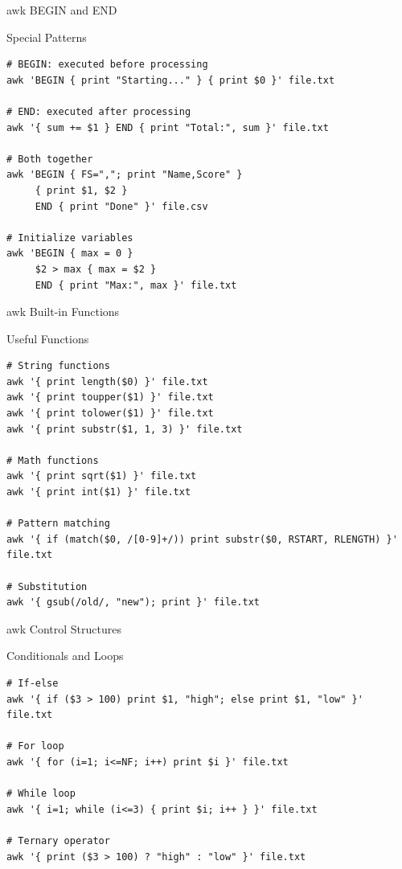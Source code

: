 \documentclass[presentation,aspectratio=1610]{beamer}
\begin{document}
\begin{frame}[label={sec:org9f205de},fragile]{awk BEGIN and END}
 \begin{block}{Special Patterns}
\begin{verbatim}
# BEGIN: executed before processing
awk 'BEGIN { print "Starting..." } { print $0 }' file.txt

# END: executed after processing
awk '{ sum += $1 } END { print "Total:", sum }' file.txt

# Both together
awk 'BEGIN { FS=","; print "Name,Score" } 
     { print $1, $2 } 
     END { print "Done" }' file.csv

# Initialize variables
awk 'BEGIN { max = 0 } 
     $2 > max { max = $2 } 
     END { print "Max:", max }' file.txt
\end{verbatim}
\end{block}
\end{frame}
\begin{frame}[label={sec:orga9a0d52},fragile]{awk Built-in Functions}
 \begin{block}{Useful Functions}
\begin{verbatim}
# String functions
awk '{ print length($0) }' file.txt
awk '{ print toupper($1) }' file.txt
awk '{ print tolower($1) }' file.txt
awk '{ print substr($1, 1, 3) }' file.txt

# Math functions
awk '{ print sqrt($1) }' file.txt
awk '{ print int($1) }' file.txt

# Pattern matching
awk '{ if (match($0, /[0-9]+/)) print substr($0, RSTART, RLENGTH) }' file.txt

# Substitution
awk '{ gsub(/old/, "new"); print }' file.txt
\end{verbatim}
\end{block}
\end{frame}
\begin{frame}[label={sec:orgf1b44da},fragile]{awk Control Structures}
 \begin{block}{Conditionals and Loops}
\begin{verbatim}
# If-else
awk '{ if ($3 > 100) print $1, "high"; else print $1, "low" }' file.txt

# For loop
awk '{ for (i=1; i<=NF; i++) print $i }' file.txt

# While loop
awk '{ i=1; while (i<=3) { print $i; i++ } }' file.txt

# Ternary operator
awk '{ print ($3 > 100) ? "high" : "low" }' file.txt
\end{verbatim}
\end{block}
\end{frame}
\end{document}
